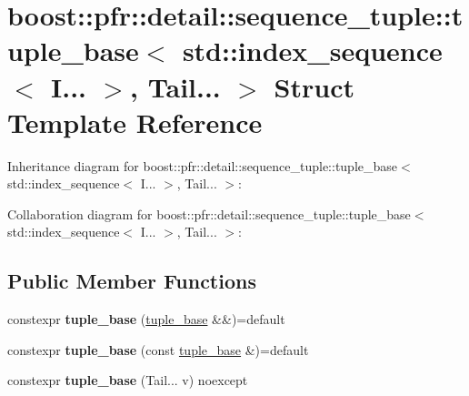 \hypertarget{structboost_1_1pfr_1_1detail_1_1sequence__tuple_1_1tuple__base_3_01std_1_1index__sequence_3_01_i6e838f08dd6d8183bf997eb8b11da646}{}\section{boost\+:\+:pfr\+:\+:detail\+:\+:sequence\+\_\+tuple\+:\+:tuple\+\_\+base$<$ std\+:\+:index\+\_\+sequence$<$ I... $>$, Tail... $>$ Struct Template Reference}
\label{structboost_1_1pfr_1_1detail_1_1sequence__tuple_1_1tuple__base_3_01std_1_1index__sequence_3_01_i6e838f08dd6d8183bf997eb8b11da646}


Inheritance diagram for boost\+:\+:pfr\+:\+:detail\+:\+:sequence\+\_\+tuple\+:\+:tuple\+\_\+base$<$ std\+:\+:index\+\_\+sequence$<$ I... $>$, Tail... $>$\+:


Collaboration diagram for boost\+:\+:pfr\+:\+:detail\+:\+:sequence\+\_\+tuple\+:\+:tuple\+\_\+base$<$ std\+:\+:index\+\_\+sequence$<$ I... $>$, Tail... $>$\+:
\subsection*{Public Member Functions}
\begin{DoxyCompactItemize}
\item 
\mbox{\label{structboost_1_1pfr_1_1detail_1_1sequence__tuple_1_1tuple__base_3_01std_1_1index__sequence_3_01_i6e838f08dd6d8183bf997eb8b11da646_ae0553e978b312fb3122716f09c0d0de2}} 
constexpr {\bfseries tuple\+\_\+base} (\mbox{\hyperlink{structboost_1_1pfr_1_1detail_1_1sequence__tuple_1_1tuple__base}{tuple\+\_\+base}} \&\&)=default
\item 
\mbox{\label{structboost_1_1pfr_1_1detail_1_1sequence__tuple_1_1tuple__base_3_01std_1_1index__sequence_3_01_i6e838f08dd6d8183bf997eb8b11da646_a35c741acb8ab014eae5e0fb95162eedd}} 
constexpr {\bfseries tuple\+\_\+base} (const \mbox{\hyperlink{structboost_1_1pfr_1_1detail_1_1sequence__tuple_1_1tuple__base}{tuple\+\_\+base}} \&)=default
\item 
\mbox{\label{structboost_1_1pfr_1_1detail_1_1sequence__tuple_1_1tuple__base_3_01std_1_1index__sequence_3_01_i6e838f08dd6d8183bf997eb8b11da646_a69c333194f62f37f3385c75c137973b6}} 
constexpr {\bfseries tuple\+\_\+base} (Tail... v) noexcept
\end{DoxyCompactItemize}
